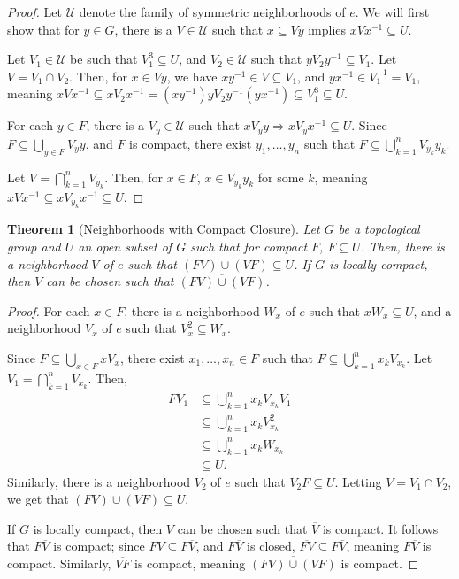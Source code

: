 \documentclass[10pt]{extarticle}
\theoremstyle{plain}
\newtheorem*{theorem}{Theorem}
\theoremstyle{definition}
\theoremstyle{note}
\renewcommand{\newline}{\hfill\break}
\begin{document}
\begin{proof}
  Let $\mathcal{U}$ denote the family of symmetric neighborhoods of $e$. We will first show that for $y\in G$, there is a $V\in \mathcal{U}$ such that $x\subseteq Vy$ implies $xVx^{-1}\subseteq U$.\newline

  Let $V_1\in \mathcal{U}$ be such that $V_1^{3}\subseteq U$, and $V_2\in \mathcal{U}$ such that $yV_2 y^{-1}\subseteq V_1$. Let $V = V_1 \cap V_2$. Then, for $x\in Vy$, we have $xy^{-1}\in V\subseteq V_1$, and $yx^{-1}\in V_1^{-1} = V_1$, meaning $xVx^{-1}\subseteq xV_2x^{-1} = \left(xy^{-1}\right) y V_2 y^{-1} \left(yx^{-1}\right) \subseteq V_1^{3}\subseteq U$.\newline

  For each $y\in F$, there is a $V_y\in \mathcal{U}$ such that $xV_y y \Rightarrow xV_y x^{-1}\subseteq U$. Since $F\subseteq \bigcup_{y\in F}V_y y$, and $F$ is compact, there exist $y_1,\dots,y_n$ such that $F\subseteq \bigcup_{k=1}^{n}V_{y_k}y_k$.\newline

  Let $V = \bigcap_{k=1}^{n}V_{y_k}$. Then, for $x\in F$, $x\in V_{y_k}y_k$ for some $k$, meaning $xVx^{-1}\subseteq xV_{y_k}x^{-1}\subseteq U$.
\end{proof}
\begin{theorem}[Neighborhoods with Compact Closure]
  Let $G$ be a topological group and $U$ an open subset of $G$ such that for compact $F$, $F\subseteq U$. Then, there is a neighborhood $V$ of $e$ such that $\left(FV\right) \cup \left(VF\right) \subseteq U$. If $G$ is locally compact, then $V$ can be chosen such that $\overline{\left(FV\right) \cup \left(VF\right)}$.
\end{theorem}
\begin{proof}
  For each $x\in F$, there is a neighborhood $W_x$ of $e$ such that $xW_x\subseteq U$, and a neighborhood $V_x$ of $e$ such that $V_x^2\subseteq W_x$.\newline

  Since $F \subseteq \bigcup_{x\in F}xV_x$, there exist $x_1,\dots,x_n\in F$ such that $F\subseteq \bigcup_{k=1}^{n}x_kV_{x_k}$. Let $V_1 = \bigcap_{k=1}^{n}V_{x_k}$. Then,
  \begin{align*}
    FV_1 &\subseteq \bigcup_{k=1}^{n}x_kV_{x_k}V_1\\
         &\subseteq \bigcup_{k=1}^{n} x_kV_{x_k}^2\\
         &\subseteq \bigcup_{k=1}^{n}x_kW_{x_k}\\
         &\subseteq U.
  \end{align*}
  Similarly, there is a neighborhood $V_2$ of $e$ such that $V_2F\subseteq U$. Letting $V = V_1\cap V_2$, we get that $\left(FV\right)\cup \left(VF\right)\subseteq U$.\newline

  If $G$ is locally compact, then $V$ can be chosen such that $\overline{V}$ is compact. It follows that $F\overline{V}$ is compact; since $FV \subseteq F\overline{V}$, and $F\overline{V}$ is closed, $\overline{FV}\subseteq F\overline{V}$, meaning $F\overline{V}$ is compact. Similarly, $\overline{VF}$ is compact, meaning $\overline{\left(FV\right) \cup \left(VF\right)}$ is compact.
\end{proof}
\end{document}

